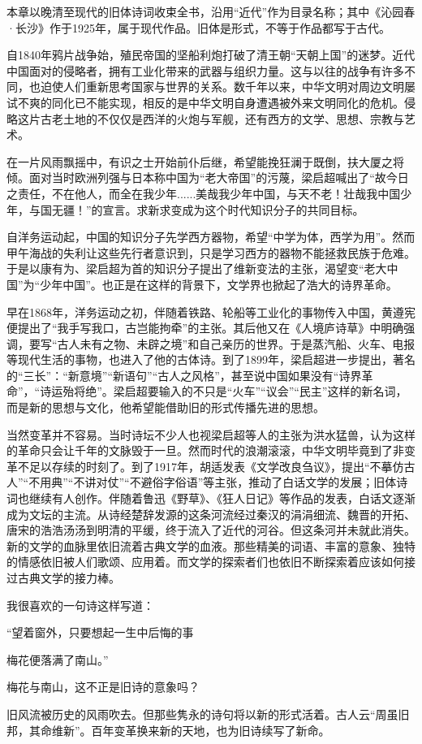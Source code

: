
\begin{intro}
本章以晚清至现代的旧体诗词收束全书，沿用“近代”作为目录名称；其中《沁园春·长沙》作于1925年，属于现代作品。旧体是形式，不等于作品都写于古代。

自1840年鸦片战争始，殖民帝国的坚船利炮打破了清王朝“天朝上国”的迷梦。近代中国面对的侵略者，拥有工业化带来的武器与组织力量。这与以往的战争有许多不同，也迫使人们重新思考国家与世界的关系。数千年以来，中华文明对周边文明屡试不爽的同化已不能实现，相反的是中华文明自身遭遇被外来文明同化的危机。侵略这片古老土地的不仅仅是西洋的火炮与军舰，还有西方的文学、思想、宗教与艺术。

在一片风雨飘摇中，有识之士开始前仆后继，希望能挽狂澜于既倒，扶大厦之将倾。面对当时欧洲列强与日本称中国为“老大帝国”的污蔑，梁启超喊出了“故今日之责任，不在他人，而全在我少年......美哉我少年中国，与天不老！壮哉我中国少年，与国无疆！”的宣言。求新求变成为这个时代知识分子的共同目标。

自洋务运动起，中国的知识分子先学西方器物，希望“中学为体，西学为用”。然而甲午海战的失利让这些先行者意识到，只是学习西方的器物不能拯救民族于危难。于是以康有为、梁启超为首的知识分子提出了维新变法的主张，渴望变“老大中国”为“少年中国”。也正是在这样的背景下，文学界也掀起了浩大的诗界革命。

早在1868年，洋务运动之初，伴随着铁路、轮船等工业化的事物传入中国，黄遵宪便提出了“我手写我口，古岂能拘牵”的主张。其后他又在《人境庐诗草》中明确强调，要写“古人未有之物、未辟之境”和自己亲历的世界。于是蒸汽船、火车、电报等现代生活的事物，也进入了他的古体诗。到了1899年，梁启超进一步提出，著名的“三长”：“新意境”“新语句”“古人之风格”，甚至说中国如果没有“诗界革命”，“诗运殆将绝”。梁启超要输入的不只是“火车”“议会”“民主”这样的新名词，而是新的思想与文化，他希望能借助旧的形式传播先进的思想。

当然变革并不容易。当时诗坛不少人也视梁启超等人的主张为洪水猛兽，认为这样的革命只会让千年的文脉毁于一旦。然而时代的浪潮滚滚，中华文明毕竟到了非变革不足以存续的时刻了。到了1917年，胡适发表《文学改良刍议》，提出“不摹仿古人”“不用典”“不讲对仗”“不避俗字俗语”等主张，推动了白话文学的发展；旧体诗词也继续有人创作。伴随着鲁迅《野草》、《狂人日记》等作品的发表，白话文逐渐成为文坛的主流。从诗经楚辞发源的这条河流经过秦汉的涓涓细流、魏晋的开拓、唐宋的浩浩汤汤到明清的平缓，终于流入了近代的河谷。但这条河并未就此消失。新的文学的血脉里依旧流着古典文学的血液。那些精美的词语、丰富的意象、独特的情感依旧被人们歌颂、应用着。而文学的探索者们也依旧不断探索着应该如何接过古典文学的接力棒。

我很喜欢的一句诗这样写道：

“望着窗外，只要想起一生中后悔的事

梅花便落满了南山。”

梅花与南山，这不正是旧诗的意象吗？

旧风流被历史的风雨吹去。但那些隽永的诗句将以新的形式活着。古人云“周虽旧邦，其命维新”。百年变革换来新的天地，也为旧诗续写了新命。
\end{intro}
